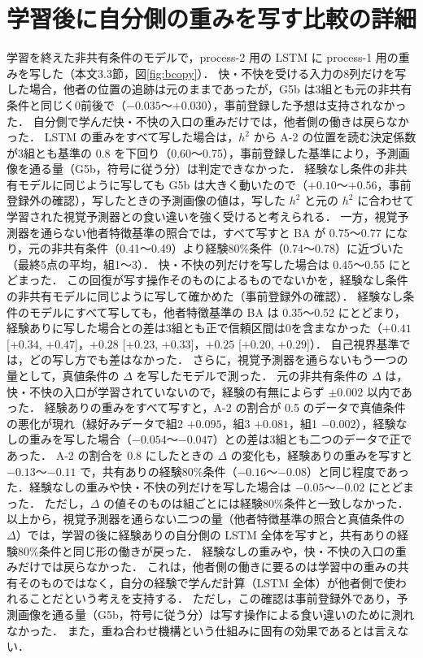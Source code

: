 \section{学習後に自分側の重みを写す比較の詳細}\label{sup:copy}
学習を終えた非共有条件のモデルで，process-2 用の LSTM に process-1 用の重みを写した（本文3.3節，図\ref{fig:bcopy}）．
快・不快を受ける入力の8列だけを写した場合，他者の位置の追跡は元のままであったが，G5b は3組とも元の非共有条件と同じく0前後で（$-0.035$〜$+0.030$），事前登録した予想は支持されなかった．
自分側で学んだ快・不快の入口の重みだけでは，他者側の働きは戻らなかった．
LSTM の重みをすべて写した場合は，$h^2$ から A-2 の位置を読む決定係数が3組とも基準の 0.8 を下回り（0.60〜0.75），事前登録した基準により，予測画像を通る量（G5b，符号に従う分）は判定できなかった．
経験なし条件の非共有モデルに同じように写しても G5b は大きく動いたので（$+0.10$〜$+0.56$，事前登録外の確認），写したときの予測画像の値は，写した $h^2$ と元の $h^2$ に合わせて学習された視覚予測器との食い違いを強く受けると考えられる．
一方，視覚予測器を通らない他者特徴基準の照合では，すべて写すと BA が 0.75〜0.77 になり，元の非共有条件（0.41〜0.49）より経験80\%条件（0.74〜0.78）に近づいた（最終5点の平均，組1〜3）．
快・不快の列だけを写した場合は 0.45〜0.55 にとどまった．
この回復が写す操作そのものによるものでないかを，経験なし条件の非共有モデルに同じように写して確かめた（事前登録外の確認）．
経験なし条件のモデルにすべて写しても，他者特徴基準の BA は 0.35〜0.52 にとどまり，経験ありに写した場合との差は3組とも正で信頼区間は0を含まなかった（$+0.41$ [$+0.34$, $+0.47$]，$+0.28$ [$+0.23$, $+0.33$]，$+0.25$ [$+0.20$, $+0.29$]）．
自己視界基準では，どの写し方でも差はなかった．
さらに，視覚予測器を通らないもう一つの量として，真値条件の $\Delta$ を写したモデルで測った．
元の非共有条件の $\Delta$ は，快・不快の入口が学習されていないので，経験の有無によらず $\pm0.002$ 以内であった．
経験ありの重みをすべて写すと，A-2 の割合が 0.5 のデータで真値条件の悪化が現れ（緑好みデータで組2 $+0.095$，組3 $+0.081$，組1 $-0.002$），経験なしの重みを写した場合（$-0.054$〜$-0.047$）との差は3組とも二つのデータで正であった．
A-2 の割合を 0.8 にしたときの $\Delta$ の変化も，経験ありの重みを写すと $-0.13$〜$-0.11$ で，共有ありの経験80\%条件（$-0.16$〜$-0.08$）と同じ程度であった．経験なしの重みや快・不快の列だけを写した場合は $-0.05$〜$-0.02$ にとどまった．
ただし，$\Delta$ の値そのものは組ごとには経験80\%条件と一致しなかった．
以上から，視覚予測器を通らない二つの量（他者特徴基準の照合と真値条件の $\Delta$）では，学習の後に経験ありの自分側の LSTM 全体を写すと，共有ありの経験80\%条件と同じ形の働きが戻った．
経験なしの重みや，快・不快の入口の重みだけでは戻らなかった．
これは，他者側の働きに要るのは学習中の重みの共有そのものではなく，自分の経験で学んだ計算（LSTM 全体）が他者側で使われることだという考えを支持する．
ただし，この確認は事前登録外であり，予測画像を通る量（G5b，符号に従う分）は写す操作による食い違いのために測れなかった．
また，重ね合わせ機構という仕組みに固有の効果であるとは言えない．

